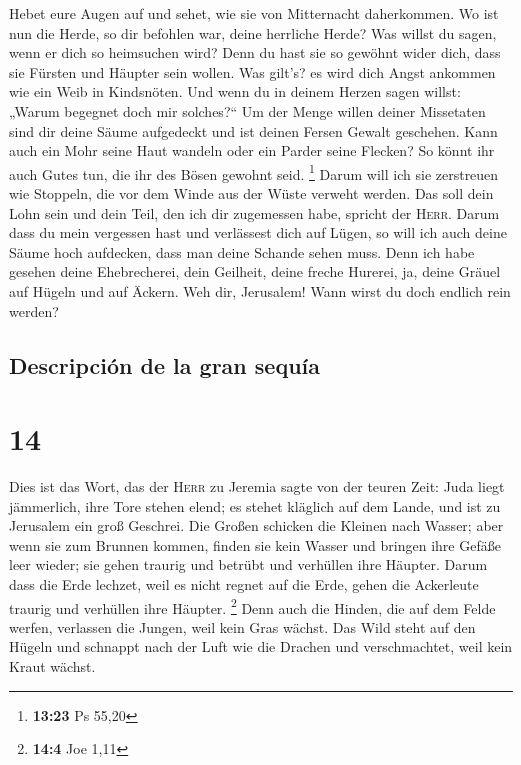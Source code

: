  Hebet eure Augen auf und sehet, wie sie von Mitternacht
daherkommen. Wo ist nun die Herde, so dir befohlen war, deine herrliche
Herde?  Was willst du sagen, wenn er dich so heimsuchen
wird? Denn du hast sie so gewöhnt wider dich, dass sie Fürsten und
Häupter sein wollen. Was gilt's? es wird dich Angst ankommen wie ein
Weib in Kindsnöten.  Und wenn du in deinem Herzen sagen
willst: „Warum begegnet doch mir solches?{}`` Um der Menge willen deiner
Missetaten sind dir deine Säume aufgedeckt und ist deinen Fersen Gewalt
geschehen.  Kann auch ein Mohr seine Haut wandeln oder
ein Parder seine Flecken? So könnt ihr auch Gutes tun, die ihr des Bösen
gewohnt seid. \footnote{\textbf{13:23} Ps 55,20}  Darum
will ich sie zerstreuen wie Stoppeln, die vor dem Winde aus der Wüste
verweht werden.  Das soll dein Lohn sein und dein Teil,
den ich dir zugemessen habe, spricht der \textsc{Herr}. Darum dass du
mein vergessen hast und verlässest dich auf Lügen,  so
will ich auch deine Säume hoch aufdecken, dass man deine Schande sehen
muss.  Denn ich habe gesehen deine Ehebrecherei, dein
Geilheit, deine freche Hurerei, ja, deine Gräuel auf Hügeln und auf
Äckern. Weh dir, Jerusalem! Wann wirst du doch endlich rein werden?

\hypertarget{descripciuxf3n-de-la-gran-sequuxeda}{%
\subsection{Descripción de la gran
sequía}\label{descripciuxf3n-de-la-gran-sequuxeda}}

\hypertarget{section-13}{%
\section{14}\label{section-13}}

 Dies ist das Wort, das der \textsc{Herr} zu Jeremia sagte
von der teuren Zeit:  Juda liegt jämmerlich, ihre Tore
stehen elend; es stehet kläglich auf dem Lande, und ist zu Jerusalem ein
groß Geschrei.  Die Großen schicken die Kleinen nach
Wasser; aber wenn sie zum Brunnen kommen, finden sie kein Wasser und
bringen ihre Gefäße leer wieder; sie gehen traurig und betrübt und
verhüllen ihre Häupter.  Darum dass die Erde lechzet, weil
es nicht regnet auf die Erde, gehen die Ackerleute traurig und verhüllen
ihre Häupter. \footnote{\textbf{14:4} Joe 1,11}  Denn auch
die Hinden, die auf dem Felde werfen, verlassen die Jungen, weil kein
Gras wächst.  Das Wild steht auf den Hügeln und schnappt
nach der Luft wie die Drachen und verschmachtet, weil kein Kraut wächst.

